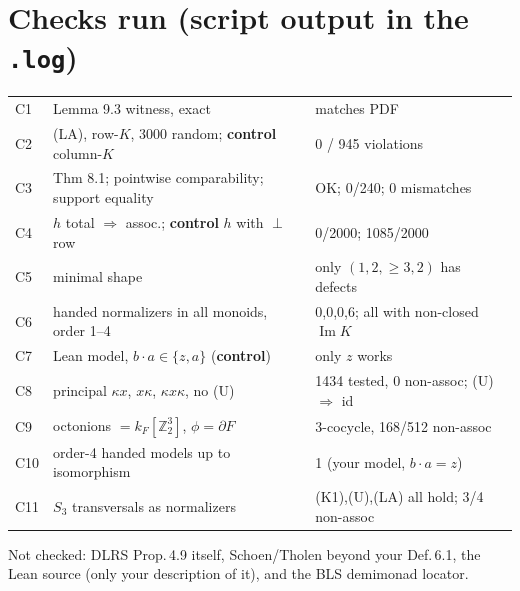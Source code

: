 \documentclass[11pt]{article}
\renewcommand{\Im}{\operatorname{Im}}
\begin{document}
\section*{Checks run (script output in the \texttt{.log})}
{\small
\begin{tabular}{lll}
\toprule
C1 & Lemma 9.3 witness, exact & matches PDF \\
C2 & (LA), row-$K$, 3000 random; \textbf{control} column-$K$ & 0 / 945 violations\\
C3 & Thm 8.1; pointwise comparability; support equality & OK; 0/240; 0 mismatches\\
C4 & $h$ total $\Rightarrow$ assoc.; \textbf{control} $h$ with $\perp$ row & 0/2000; 1085/2000\\
C5 & minimal shape & only $(1,2,{\ge}3,2)$ has defects\\
C6 & handed normalizers in all monoids, order 1--4 & 0,0,0,6; all with non-closed $\Im K$\\
C7 & Lean model, $b\cdot a\in\{z,a\}$ (\textbf{control}) & only $z$ works\\
C8 & principal $\kappa x$, $x\kappa$, $\kappa x\kappa$, no (U) & 1434 tested, 0 non-assoc; (U) $\Rightarrow$ id\\
C9 & octonions $=k_F[\mathbb{Z}_2^3]$, $\phi=\partial F$ & 3-cocycle, 168/512 non-assoc\\
C10 & order-4 handed models up to isomorphism & 1 (your model, $b\cdot a=z$)\\
C11 & $S_3$ transversals as normalizers & (K1),(U),(LA) all hold; 3/4 non-assoc\\
\bottomrule
\end{tabular}}

Not checked: DLRS Prop.\,4.9 itself, Schoen/Tholen beyond your Def.\,6.1, the Lean source (only your
description of it), and the BLS demimonad locator.
\end{document}
